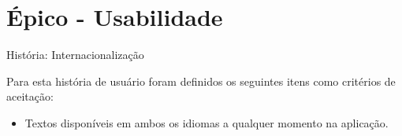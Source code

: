 \section{Épico - Usabilidade}
\label{gestão_usabilidade}
\def\arraystretch{2}
\begin{quadro}[htb]
\centering
\ABNTEXfontereduzida
\caption[História: Internacionalização]{História: Internacionalização}
\end{quadro}
\FloatBarrier 

Para esta história de usuário foram definidos os seguintes itens como critérios de aceitação:

\begin{itemize}
\item  Textos disponíveis em ambos os idiomas a qualquer momento na aplicação.
\end{itemize}
